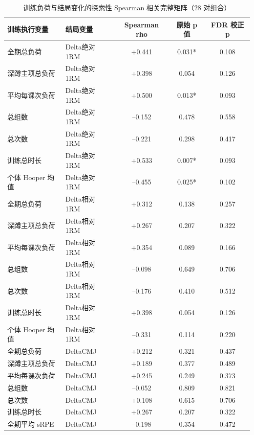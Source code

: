 \begin{table}[htbp]
\centering
\caption{训练负荷与结局变化的探索性 Spearman 相关完整矩阵（28 对组合）}
\label{tab:app_spearman_full}
\begin{threeparttable}
\begin{tabular}{llccc}
\toprule
训练执行变量 & 结局变量 & Spearman rho & 原始 p 值 & FDR 校正 p \\
\midrule
全期总负荷        & Delta绝对 1RM & +0.441 & 0.031* & 0.108 \\
深蹲主项总负荷    & Delta绝对 1RM & +0.398 & 0.054  & 0.126 \\
平均每课次负荷    & Delta绝对 1RM & +0.500 & 0.013* & 0.093 \\
总组数            & Delta绝对 1RM & --0.152 & 0.478  & 0.558 \\
总次数            & Delta绝对 1RM & --0.221 & 0.298  & 0.417 \\
训练总时长        & Delta绝对 1RM & +0.533 & 0.007* & 0.093 \\
个体 Hooper 均值  & Delta绝对 1RM & --0.455 & 0.025* & 0.102 \\
\midrule
全期总负荷        & Delta相对 1RM & +0.312 & 0.138 & 0.257 \\
深蹲主项总负荷    & Delta相对 1RM & +0.267 & 0.207 & 0.322 \\
平均每课次负荷    & Delta相对 1RM & +0.354 & 0.089 & 0.166 \\
总组数            & Delta相对 1RM & --0.098 & 0.649 & 0.706 \\
总次数            & Delta相对 1RM & --0.176 & 0.410 & 0.512 \\
训练总时长        & Delta相对 1RM & +0.398 & 0.054 & 0.126 \\
个体 Hooper 均值  & Delta相对 1RM & --0.331 & 0.114 & 0.220 \\
\midrule
全期总负荷        & DeltaCMJ & +0.212 & 0.321 & 0.437 \\
深蹲主项总负荷    & DeltaCMJ & +0.189 & 0.377 & 0.489 \\
平均每课次负荷    & DeltaCMJ & +0.245 & 0.249 & 0.373 \\
总组数            & DeltaCMJ & --0.052 & 0.809 & 0.821 \\
总次数            & DeltaCMJ & +0.108 & 0.615 & 0.706 \\
训练总时长        & DeltaCMJ & +0.267 & 0.207 & 0.322 \\
全期平均 sRPE     & DeltaCMJ & --0.198 & 0.354 & 0.472 \\

\end{tabular}
\end{threeparttable}
\end{table}
